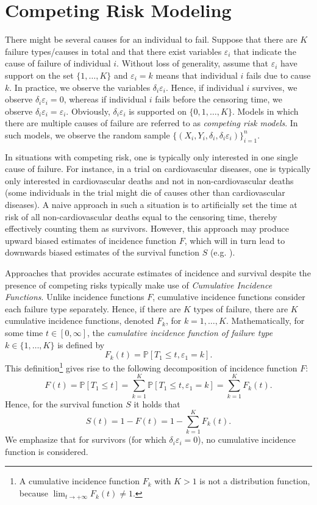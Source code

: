 \documentclass[11pt]{article}
\renewcommand{\P}{\mathbb{P}}
\begin{document}
\section{Competing Risk Modeling}
There might be several causes for an individual to fail. Suppose that there are $K$ failure types/causes in total and that there exist variables $\varepsilon_i$ that indicate the cause of failure of individual $i$. Without loss of generality, assume that $\varepsilon_i$ have support on the set $\{1,\dots,K\}$ and $\varepsilon_i = k$ means that individual $i$ fails due to cause $k$. In practice, we observe the variables $\delta_i\varepsilon_i$. Hence, if individual $i$ survives, we observe $\delta_i\varepsilon_i = 0$, whereas if individual $i$ fails before the censoring time, we observe $\delta_i\varepsilon_i =\varepsilon_i$. Obviously, $\delta_i\varepsilon_i$ is supported on $\{0,1,\dots,K\}$. Models in which there are multiple causes of failure are referred to as \textit{competing risk models}. In such models, we observe the random sample $\{ (X_i, Y_i, \delta_i, \delta_i\varepsilon_i) \}_{i=1}^n$.

In situations with competing risk, one is typically only interested in one single cause of failure. For instance, in a trial on cardiovascular diseases, one is typically only interested in cardiovascular deaths and not in non-cardiovascular deaths (some individuals in the trial might die of causes other than cardiovascular diseases). A naive approach in such a situation is to artificially set the time at risk of all non-cardiovascular deaths equal to the censoring time, thereby effectively counting them as survivors. However, this approach may produce upward biased estimates of incidence function $F$, which will in turn lead to downwards biased estimates of the survival function $S$ (e.g. \citealp{austin2016introduction}). 

Approaches that provides accurate estimates of incidence and survival despite the presence of competing risks typically make use of \textit{Cumulative Incidence Functions}. Unlike incidence functions $F$, cumulative incidence functions consider each failure type separately. Hence, if there are $K$ types of failure, there are $K$ cumulative incidence functions, denoted $F_k$, for $k=1,\dots,K$. Mathematically, for some time $t\in[0,\infty]$, the \textit{cumulative incidence function of failure type} $k\in\{1,\dots,K\}$ is defined by
\[
    F_k(t) = \P[T_1 \leq t , \varepsilon_1 = k].
\]
This definition\footnote{A cumulative incidence function $F_k$ with $K>1$ is not a distribution function, because $\lim_{t\to+\infty}F_k(t) \neq 1$.} gives rise to the following decomposition of incidence function $F$:
\[
    F(t) = \P[T_1 \leq t] = \sum_{k=1}^K \P[T_1 \leq t, \varepsilon_1 = k] = \sum_{k=1}^K F_k(t).
\]
Hence, for the survival function $S$ it holds that
\[
    S(t) = 1 - F(t) = 1 -  \sum_{k=1}^K F_k(t).
\]
We emphasize that for survivors (for which $\delta_i\varepsilon_i=0$), no cumulative incidence function is considered.  
\end{document}
